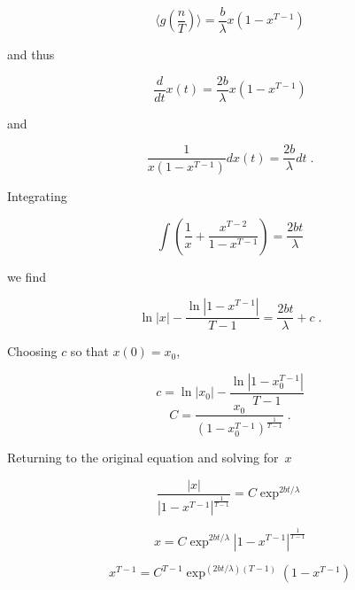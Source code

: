 
$$\langle g(\frac{n}{T})\rangle=\frac{b}{\lambda}x(1-x^{T-1})$$

and thus

$$\frac{d}{dt}x(t)=\frac{2b}{\lambda}x(1-x^{T-1})$$

and

$$\frac{1}{x(1-x^{T-1})}dx(t)=\frac{2b}{\lambda}dt\;.$$




Integrating

$$\int(\frac{1}{x} + \frac{x^{T-2}}{1-x^{T-1}})=\frac{2bt}{\lambda}$$




we find

$$\ln|x|-\frac{\ln|1-x^{T-1}|}{T-1}=\frac{2bt}{\lambda}+c\;.$$

Choosing $c$ so that $x(0)=x_0$,

$$c=\ln|x_0|-\frac{\ln|1-x_0^{T-1}|}{T-1}$$
$$C=\frac{x_0}{(1-x_0^{T-1})^\frac{1}{T-1}}\;.$$

Returning to the original equation and solving for~$x$

$$\frac{|x|}{|1-x^{T-1}|^\frac{1}{T-1}}=C\exp^{2bt/\lambda}$$

$$x=C\exp^{2bt/\lambda}|1-x^{T-1}|^\frac{1}{T-1}$$

$$x^{T-1}=C^{T-1}\exp^{(2bt/\lambda)(T-1)}(1-x^{T-1})$$


